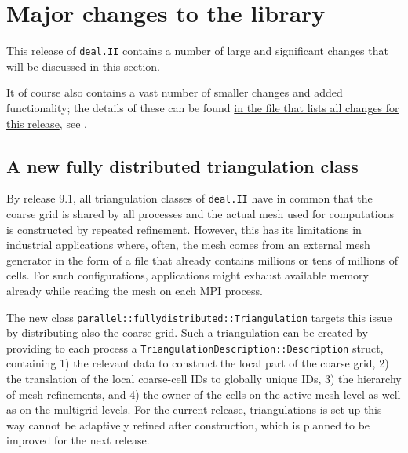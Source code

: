\documentclass{ansarticle-preprint}
\newcommand{\specialword}[1]{\texttt{#1}}
\newcommand{\dealii}{{\specialword{deal.II}}\xspace}
\begin{document}
\section{Major changes to the library}
\label{sec:major}

This release of \dealii contains a number of large and significant changes
that will be discussed in this section.

It of course also contains a
vast number of smaller changes and added functionality; the details of these
can be found
\href{https://dealii.org/developer/doxygen/deal.II/changes_between_9_0_1_and_9_1_0.html}{
in the file that lists all changes for this release}, see \cite{changes91}.


\subsection{A new fully distributed triangulation class}
\label{subsec:pft}

By release 9.1, all triangulation classes of \texttt{deal.II} have in common that the coarse grid is shared by
all processes and the actual mesh used for computations is constructed by repeated
refinement. However, this has its limitations in industrial applications where, often, the mesh comes
from an external mesh generator in the form of a file that already contains millions
or tens of millions of cells. For such configurations, applications might exhaust
available memory already while reading the mesh on each MPI process.

The new class \texttt{parallel::fullydistributed::Triangulation} targets this issue
by distributing also the coarse grid. Such
a triangulation can be created by providing to each process a \texttt{Triangulation\-De\-scrip\-tion::Description} struct, containing
1) the relevant data to construct the local part of the coarse grid, 2) the
translation of the local coarse-cell IDs to globally unique IDs, 3) the hierarchy
of mesh refinements, and 4) the owner of the cells on the active mesh level as well
as on the multigrid levels. For the current release, triangulations is set up
this way cannot be adaptively refined after construction, which is planned to be
improved for the next release.
\end{document}
